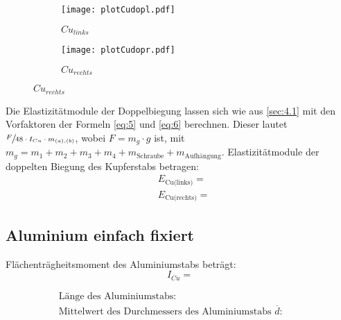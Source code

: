 \begin{figure}[H]
\caption{Graph für Doppelbiegung, $Cu_{links}$ und $Cu_{rechts}$}
\label{fig:2}
\begin{subfigure}{0.495\linewidth}
    \centering
    \texttt{[image: plotCudopl.pdf]}
    \caption{$Cu_{links}$}
    \label{fig:2a}
\end{subfigure}
\begin{subfigure}{0.495\linewidth}
    \centering
    \texttt{[image: plotCudopr.pdf]}
    \caption{$Cu_{rechts}$}
    \label{fig:2b}
\end{subfigure}
\end{figure}

Die Elastizitätmodule der Doppelbiegung lassen sich wie aus \ref{sec:4.1} mit den Vorfaktoren der Formeln \eqref{eq:5} und \eqref{eq:6}
berechnen. Dieser lautet $\sfrac{F}{48 \cdot I_{Cu} \cdot m_{(a),(b)}}$, wobei $F = m_g\cdot g$ ist, mit $m_g = m_1 + m_2 + m_3 + m_4 + m_{\text{Schraube}}
+ m_{\text{Aufhängung}}$.
\justifying Elastizitätmodule der doppelten Biegung des Kupferstabs betragen:
\begin{align}
    &E_{\text{Cu(links)}} = \text{} \label{eq:}\\
    &E_{\text{Cu(rechts)}} = \text{} \label{eq:}
\end{align}


\subsection{Aluminium einfach fixiert}\label{sec:4.3}

\justifying Flächenträgheitsmoment des Aluminiumstabs beträgt:
\begin{equation}
I_{Cu} = \text{} \label{eq:}
\end{equation}

\begin{subequations}\label{eq:}
\begin{align}
    &\text{Länge des Aluminiumstabs:} \qquad &\text{} \label{eq:a}\\
    &\text{Mittelwert des Durchmessers des Aluminiumstabs $\overline{d}$:} \qquad &\text{} \label{eq:b}\\
\end{align}
\end{subequations}

